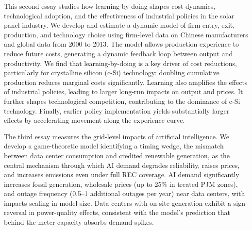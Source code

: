 This second essay studies how learning-by-doing shapes cost dynamics, technological adoption, and the effectiveness of industrial policies in the solar panel industry. We develop and estimate a dynamic model of firm entry, exit, production, and technology choice using firm-level data on Chinese manufacturers and global data from 2000 to 2013. The model allows production experience to reduce future costs, generating a dynamic feedback loop between output and productivity.
We find that learning-by-doing is a key driver of cost reductions, particularly for crystalline silicon (c-Si) technology: doubling cumulative production reduces marginal costs significantly. Learning also amplifies the effects of industrial policies, leading to larger long-run impacts on output and prices. It further shapes technological competition, contributing to the dominance of c-Si technology. Finally, earlier policy implementation yields substantially larger effects by accelerating movement along the experience curve.

The third essay measures the grid-level impacts of artificial intelligence. We develop a game-theoretic model identifying a timing wedge, the mismatch between data center consumption and credited renewable generation, as the central mechanism through which AI demand degrades reliability, raises prices, and increases emissions even under full REC coverage. AI demand significantly increases fossil generation, wholesale prices (up to 25\% in treated PJM zones), and outage frequency (0.5–1 additional outages per year) near data centers, with impacts scaling in model size. Data centers with on-site generation exhibit a sign reversal in power-quality effects, consistent with the model's prediction that behind-the-meter capacity absorbs demand spikes.

\clearpage
